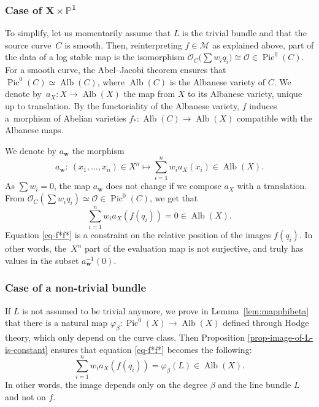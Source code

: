 \documentclass[pdftex]{sigma}
\newcommand{\Pic}{\operatorname{Pic}}
\newcommand{\Alb}{\operatorname{Alb}}
\newcommand{\PP}{\mathbb{P}}
\newcommand{\bfw}{ {\boldsymbol w} }
\newcommand{\M}{\mathcal{M}}
\renewcommand{\O}{\mathcal{O}}
\numberwithin{equation}{section}
\theoremstyle{definition}
\begin{document}
\subsubsection[Case of X times P\^{}1]{Case of $\boldsymbol{ X\times\PP^1}$}


To simplify, let us momentarily assume that $L$ is the trivial bundle and that the source curve~$C$ is smooth.
 Then, reinterpreting $f\in\M$ as explained above, part of the data of a log stable map is the isomorphism
$
\O_C\bigl(\sum w_iq_i\bigr)\cong\O\in\Pic^0(C)$.
For a smooth curve, the Abel--Jacobi theorem ensures that $\Pic^0(C)\simeq\Alb(C)$, where $\Alb(C)$ is the Albanese variety of $C$.
 We denote by~${a_X\colon X\to\Alb(X)}$ the map from $X$ to its Albanese variety, unique up to translation. By the functoriality of the Albanese variety, $f$ induces a~morphism of Abelian varieties
$
 f_*\colon \Alb(C)\to\Alb(X)
$ compatible with the Albanese maps.

We denote by $a_\bfw$ the morphism
\[
 a_\bfw\colon\ (x_1,\dots,x_n)\in X^n\longmapsto \sum_{i=1}^n w_i a_X(x_i)\in\Alb(X).
 \]
As $\sum w_i=0$, the map $a_\bfw$ does not change if we compose $a_X$ with a translation. From $\O_C(\sum w_iq_i)\simeq\O\in\Pic^0(C)$, we get that
\begin{equation}\label{eq-f*f*}
 \sum_{i=1}^n w_i a_X(f(q_i)) =0\in\Alb(X).
\end{equation}
Equation \eqref{eq-f*f*} is a constraint on the relative position of the images $f(q_i)$. In other words, the~$X^n$ part of the evaluation map is not surjective, and truly has values in the subset $a_\bfw^{-1}(0)$.


\subsubsection{Case of a non-trivial bundle} If $L$ is not assumed to be trivial anymore, we prove in Lemma~\ref{lem:mapphibeta} that there is a natural map $\varphi_\beta\colon \Pic^0(X)\to\Alb(X)$ defined through Hodge theory, which only depend on the curve class. Then
Proposition \ref{prop-image-of-L-is-constant} ensures that equation \eqref{eq-f*f*} becomes the following:
\begin{equation}\label{eq-f*f*L}
\sum_{i=1}^n w_ia_X(f(q_i)) = \varphi_\beta(L)\in\Alb(X).
\end{equation}
In other words, the image depends only on the degree $\beta$ and the line bundle $L$ and not on $f$.
\end{document}
